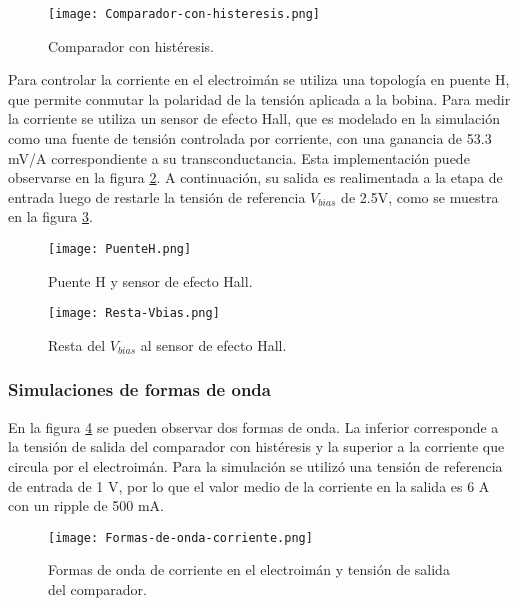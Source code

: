 \begin{figure}[H]
	\centering
	\texttt{[image: Comparador-con-histeresis.png]}
	\caption{Comparador con histéresis.}
	\label{fig:img_comp-con-hist}
\end{figure}

\noindent Para controlar la corriente en el electroimán se utiliza una topología en puente H, que permite conmutar la polaridad de la tensión aplicada a la bobina. Para medir la corriente se utiliza un sensor de efecto Hall, que es modelado en la simulación como  una fuente de tensión controlada por corriente, con una ganancia de 53.3 mV/A correspondiente a su transconductancia. Esta implementación puede observarse en la figura \ref{fig:img_puenteH}. A continuación, su salida es realimentada a la etapa de entrada luego de restarle la tensión de referencia  $V_{bias}$ de 2.5V, como se muestra en la figura \ref{fig:img_resta-Vbias}. 

\begin{figure}[H]
	\centering
	\texttt{[image: PuenteH.png]}
	\caption{Puente H y sensor de efecto Hall.}
	\label{fig:img_puenteH}
\end{figure}

\begin{figure}[H]
	\centering
	\texttt{[image: Resta-Vbias.png]}
	\caption{Resta del $V_{bias}$ al sensor de efecto Hall.}
	\label{fig:img_resta-Vbias}
\end{figure}

\subsubsection{Simulaciones de formas de onda}

\noindent En la figura \ref{fig:img_formas-de-onda-corriente} se pueden observar dos formas de onda. La inferior  corresponde a la tensión de salida del comparador con histéresis y la superior a la corriente que circula por el electroimán. Para la simulación se utilizó una tensión de referencia de entrada de 1 V, por lo que el valor medio de la corriente en la salida es 6 A con un ripple de 500 mA.

\begin{figure}[H]
	\centering
	\texttt{[image: Formas-de-onda-corriente.png]}
	\caption{Formas de onda de corriente en el electroimán y tensión de salida del comparador.}
	\label{fig:img_formas-de-onda-corriente}
\end{figure}



